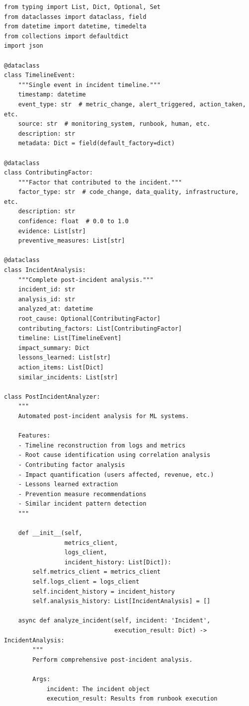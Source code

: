 \begin{lstlisting}[style=python, caption={Post-incident analysis with root cause identification}]
from typing import List, Dict, Optional, Set
from dataclasses import dataclass, field
from datetime import datetime, timedelta
from collections import defaultdict
import json

@dataclass
class TimelineEvent:
    """Single event in incident timeline."""
    timestamp: datetime
    event_type: str  # metric_change, alert_triggered, action_taken, etc.
    source: str  # monitoring_system, runbook, human, etc.
    description: str
    metadata: Dict = field(default_factory=dict)

@dataclass
class ContributingFactor:
    """Factor that contributed to the incident."""
    factor_type: str  # code_change, data_quality, infrastructure, etc.
    description: str
    confidence: float  # 0.0 to 1.0
    evidence: List[str]
    preventive_measures: List[str]

@dataclass
class IncidentAnalysis:
    """Complete post-incident analysis."""
    incident_id: str
    analysis_id: str
    analyzed_at: datetime
    root_cause: Optional[ContributingFactor]
    contributing_factors: List[ContributingFactor]
    timeline: List[TimelineEvent]
    impact_summary: Dict
    lessons_learned: List[str]
    action_items: List[Dict]
    similar_incidents: List[str]

class PostIncidentAnalyzer:
    """
    Automated post-incident analysis for ML systems.

    Features:
    - Timeline reconstruction from logs and metrics
    - Root cause identification using correlation analysis
    - Contributing factor analysis
    - Impact quantification (users affected, revenue, etc.)
    - Lessons learned extraction
    - Prevention measure recommendations
    - Similar incident pattern detection
    """

    def __init__(self,
                 metrics_client,
                 logs_client,
                 incident_history: List[Dict]):
        self.metrics_client = metrics_client
        self.logs_client = logs_client
        self.incident_history = incident_history
        self.analysis_history: List[IncidentAnalysis] = []

    async def analyze_incident(self, incident: 'Incident',
                               execution_result: Dict) -> IncidentAnalysis:
        """
        Perform comprehensive post-incident analysis.

        Args:
            incident: The incident object
            execution_result: Results from runbook execution


\end{lstlisting}
